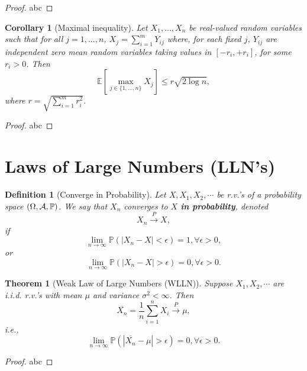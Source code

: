 \documentclass[openany,12pt]{book}
\newtheorem{theorem}{Theorem}[chapter]
\newtheorem{corollary}{Corollary}[chapter]
\newtheorem{definition}{Definition}[chapter]
\begin{document}
\begin{proof}
  abc
\end{proof}

\begin{corollary}[Maximal inequality]
  Let $X_1,\dots,X_n$ be real-valued random variables such that for all $j=1,\dots,n$, $X_j=\sum_{i=1}^{m}Y_{ij}$ where, for each fixed $j$, $Y_{ij}$ are independent zero mean random variables taking values in $[-r_i, +r_i]$, for some $r_i>0$. Then
  \begin{equation}
    \mathbb{E}\left[\max_{j\in\{1,\dots,n\}}X_j\right]\leqslant r\sqrt{2\log n},
  \end{equation}
  where $r=\sqrt{\sum_{i=1}^{m}r_i^2}$.
\end{corollary}

\begin{proof}
  abc
\end{proof}

\section{Laws of Large Numbers (LLN's)}

\begin{definition}[Converge in Probability]
  Let $X,X_{1}, X_{2},\cdots$ be r.v.'s of a probability space $(\Omega,\mathcal{A},\mathbb{P})$. We say that $X_{n}$ converges to $X$ \textbf{in probability}, denoted
  \[X_{n}\xrightarrow{ P }X,\]
  if
  \[\lim_{n \to \infty}{\mathbb{P}(\left| X_{n} - X \right| < \epsilon)} = 1, \forall\epsilon > 0,\]
  or
  \[\lim_{n \to \infty}{\mathbb{P}(\left| X_{n} - X \right| > \epsilon)} = 0, \forall\epsilon > 0.\]
\end{definition}

\begin{theorem}[Weak Law of Large Numbers (WLLN)]
  Suppose $X_{1}, X_{2}, \cdots$ are i.i.d. r.v.'s with mean $\mu$ and variance $\sigma^{2} < \infty$. Then
  \[\overline{X_{n}} = \frac{1}{n}\sum_{i = 1}^{n}X_{i}\xrightarrow{ P }\mu,\]
  i.e.,
  \[ \lim_{n \to \infty}{\mathbb{P}\left( \left| \overline{X_{n}} - \mu \right| > \epsilon \right)} = 0, \forall\epsilon > 0.\]
\end{theorem}

\begin{proof}
  abc
\end{proof}
\end{document}
